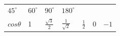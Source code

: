 {\begin{center}
\begin{xtabular*}{\mytablewidth}[t]{|p{10\mystarwidth}|p{10\mystarwidth}|p{10\mystarwidth}|p{10\mystarwidth}|p{10\mystarwidth}|p{10\mystarwidth}|p{10\mystarwidth}|}
                ${45}^{\circ }$
               &
                ${60}^{\circ }$
               &
                ${90}^{\circ }$
               &
                ${180}^{\circ }$
     \tabularnewline{}
                $cos\theta $
               &
        1 &
                $\frac{\sqrt{3}}{2}$
               &
                $\frac{1}{\sqrt{2}}$
               &
                $\frac{1}{2}$
               &
        0 &
                $-1$
     \tabularnewline{}

\end{xtabular*}
\end{center}}
